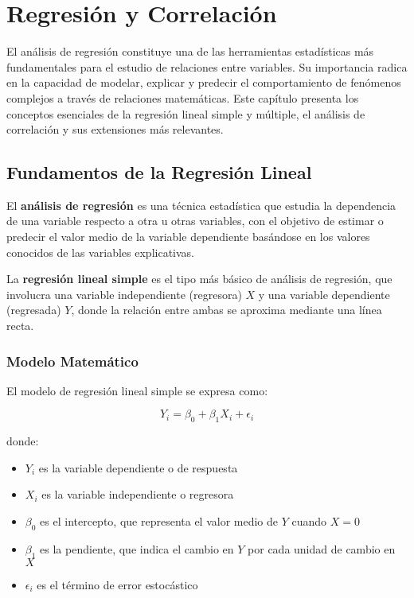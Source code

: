 \chapter{Regresión y Correlación}

El análisis de regresión constituye una de las herramientas estadísticas más fundamentales para el estudio de relaciones entre variables. Su importancia radica en la capacidad de modelar, explicar y predecir el comportamiento de fenómenos complejos a través de relaciones matemáticas. Este capítulo presenta los conceptos esenciales de la regresión lineal simple y múltiple, el análisis de correlación y sus extensiones más relevantes.

\section{Fundamentos de la Regresión Lineal}

\begin{definition}
El \textbf{análisis de regresión} es una técnica estadística que estudia la dependencia de una variable respecto a otra u otras variables, con el objetivo de estimar o predecir el valor medio de la variable dependiente basándose en los valores conocidos de las variables explicativas.
\end{definition}

\begin{definition}
La \textbf{regresión lineal simple} es el tipo más básico de análisis de regresión, que involucra una variable independiente (regresora) $X$ y una variable dependiente (regresada) $Y$, donde la relación entre ambas se aproxima mediante una línea recta.
\end{definition}

\subsection{Modelo Matemático}

El modelo de regresión lineal simple se expresa como:

$$Y_i = \beta_0 + \beta_1 X_i + \epsilon_i$$

donde:
\begin{itemize}
\item $Y_i$ es la variable dependiente o de respuesta
\item $X_i$ es la variable independiente o regresora
\item $\beta_0$ es el intercepto, que representa el valor medio de $Y$ cuando $X = 0$
\item $\beta_1$ es la pendiente, que indica el cambio en $Y$ por cada unidad de cambio en $X$
\item $\epsilon_i$ es el término de error estocástico
\end{itemize}

